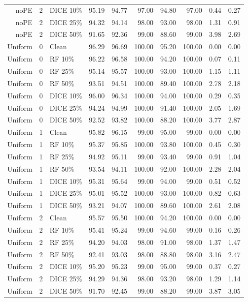 {\begin{longtable}{rllrrrrrrr}
noPE & 2 & DICE 10\% & 95.19 & 94.77 & 97.00 & 94.80 & 97.00 & 0.44 & 0.27 \\
noPE & 2 & DICE 25\% & 94.32 & 94.14 & 98.00 & 93.00 & 98.00 & 1.31 & 0.91 \\
noPE & 2 & DICE 50\% & 91.65 & 92.36 & 99.00 & 88.60 & 99.00 & 3.98 & 2.69 \\
Uniform & 0 & Clean & 96.29 & 96.69 & 100.00 & 95.20 & 100.00 & 0.00 & 0.00 \\
Uniform & 0 & RF 10\% & 96.22 & 96.58 & 100.00 & 94.20 & 100.00 & 0.07 & 0.11 \\
Uniform & 0 & RF 25\% & 95.14 & 95.57 & 100.00 & 93.00 & 100.00 & 1.15 & 1.11 \\
Uniform & 0 & RF 50\% & 93.51 & 94.51 & 100.00 & 89.40 & 100.00 & 2.78 & 2.18 \\
Uniform & 0 & DICE 10\% & 96.00 & 96.34 & 100.00 & 94.00 & 100.00 & 0.29 & 0.35 \\
Uniform & 0 & DICE 25\% & 94.24 & 94.99 & 100.00 & 91.40 & 100.00 & 2.05 & 1.69 \\
Uniform & 0 & DICE 50\% & 92.52 & 93.82 & 100.00 & 88.20 & 100.00 & 3.77 & 2.87 \\
Uniform & 1 & Clean & 95.82 & 96.15 & 99.00 & 95.00 & 99.00 & 0.00 & 0.00 \\
Uniform & 1 & RF 10\% & 95.37 & 95.85 & 100.00 & 93.80 & 100.00 & 0.45 & 0.30 \\
Uniform & 1 & RF 25\% & 94.92 & 95.11 & 99.00 & 93.40 & 99.00 & 0.91 & 1.04 \\
Uniform & 1 & RF 50\% & 93.54 & 94.11 & 100.00 & 92.00 & 100.00 & 2.28 & 2.04 \\
Uniform & 1 & DICE 10\% & 95.31 & 95.64 & 99.00 & 94.00 & 99.00 & 0.51 & 0.52 \\
Uniform & 1 & DICE 25\% & 95.01 & 95.52 & 100.00 & 93.00 & 100.00 & 0.82 & 0.63 \\
Uniform & 1 & DICE 50\% & 93.21 & 94.07 & 100.00 & 89.60 & 100.00 & 2.61 & 2.08 \\
Uniform & 2 & Clean & 95.57 & 95.50 & 100.00 & 94.20 & 100.00 & 0.00 & 0.00 \\
Uniform & 2 & RF 10\% & 95.41 & 95.24 & 99.00 & 94.60 & 99.00 & 0.16 & 0.26 \\
Uniform & 2 & RF 25\% & 94.20 & 94.03 & 98.00 & 91.00 & 98.00 & 1.37 & 1.47 \\
Uniform & 2 & RF 50\% & 92.41 & 93.03 & 98.00 & 88.80 & 98.00 & 3.16 & 2.47 \\
Uniform & 2 & DICE 10\% & 95.20 & 95.23 & 99.00 & 95.00 & 99.00 & 0.37 & 0.27 \\
Uniform & 2 & DICE 25\% & 94.29 & 94.36 & 98.00 & 93.20 & 98.00 & 1.29 & 1.14 \\
Uniform & 2 & DICE 50\% & 91.70 & 92.45 & 99.00 & 88.20 & 99.00 & 3.87 & 3.05 \\
\end{longtable}
}

